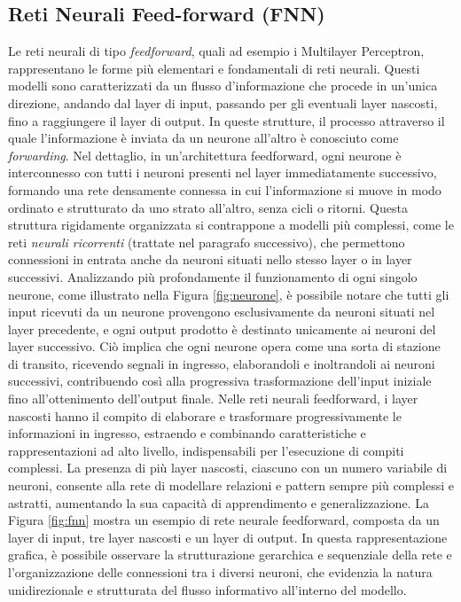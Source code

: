 \documentclass[12pt,a4paper,twoside,openright]{book}
\begin{document}
\subsection{Reti Neurali Feed-forward (FNN)}
Le reti neurali di tipo \emph{feedforward}, quali ad esempio i Multilayer Perceptron, rappresentano le forme più elementari e fondamentali di reti neurali. Questi modelli sono caratterizzati da un flusso d’informazione che procede in un’unica direzione, andando dal layer di input, passando per gli eventuali layer nascosti, fino a raggiungere il layer di output. In queste strutture, il processo attraverso il quale l’informazione è inviata da un neurone all’altro è conosciuto come \emph{forwarding}.
Nel dettaglio, in un'architettura feedforward, ogni neurone è interconnesso con tutti i neuroni presenti nel layer immediatamente successivo, formando una rete densamente connessa in cui l'informazione si muove in modo ordinato e strutturato da uno strato all'altro, senza cicli o ritorni. Questa struttura rigidamente organizzata si contrappone a modelli più complessi, come le reti \emph{neurali ricorrenti} (trattate nel paragrafo successivo), che permettono connessioni in entrata anche da neuroni situati nello stesso layer o in layer successivi.
Analizzando più profondamente il funzionamento di ogni singolo neurone, come illustrato nella Figura \ref{fig:neurone}, è possibile notare che tutti gli input ricevuti da un neurone provengono esclusivamente da neuroni situati nel layer precedente, e ogni output prodotto è destinato unicamente ai neuroni del layer successivo. Ciò implica che ogni neurone opera come una sorta di stazione di transito, ricevendo segnali in ingresso, elaborandoli e inoltrandoli ai neuroni successivi, contribuendo così alla progressiva trasformazione dell'input iniziale fino all'ottenimento dell'output finale.
Nelle reti neurali feedforward, i layer nascosti hanno il compito di elaborare e trasformare progressivamente le informazioni in ingresso, estraendo e combinando caratteristiche e rappresentazioni ad alto livello, indispensabili per l'esecuzione di compiti complessi. La presenza di più layer nascosti, ciascuno con un numero variabile di neuroni, consente alla rete di modellare relazioni e pattern sempre più complessi e astratti, aumentando la sua capacità di apprendimento e generalizzazione.
La Figura \ref{fig:fnn} mostra un esempio di rete neurale feedforward, composta da un layer di input, tre layer nascosti e un layer di output. In questa rappresentazione grafica, è possibile osservare la strutturazione gerarchica e sequenziale della rete e l'organizzazione delle connessioni tra i diversi neuroni, che evidenzia la natura unidirezionale e strutturata del flusso informativo all'interno del modello.
\end{document}

